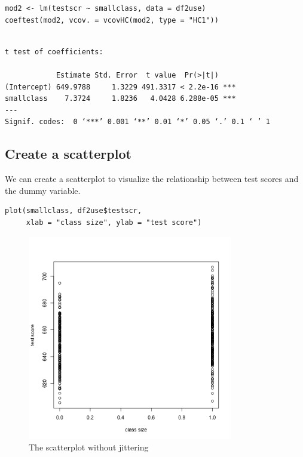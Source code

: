 \documentclass[11pt]{article}
\begin{document}
\begin{verbatim}
mod2 <- lm(testscr ~ smallclass, data = df2use)
coeftest(mod2, vcov. = vcovHC(mod2, type = "HC1"))
\end{verbatim}

\begin{verbatim}

t test of coefficients:

            Estimate Std. Error  t value  Pr(>|t|)
(Intercept) 649.9788     1.3229 491.3317 < 2.2e-16 ***
smallclass    7.3724     1.8236   4.0428 6.288e-05 ***
---
Signif. codes:  0 ‘***’ 0.001 ‘**’ 0.01 ‘*’ 0.05 ‘.’ 0.1 ‘ ’ 1
\end{verbatim}


\subsection*{Create a scatterplot}
\label{sec:orgfcd5ef1}

We can create a scatterplot to visualize the relationship between test
scores and the dummy variable.
\begin{verbatim}
plot(smallclass, df2use$testscr,
     xlab = "class size", ylab = "test score")
\end{verbatim}

\begin{figure}[htbp]
\centering
\includegraphics[width=0.8\textwidth]{scatter_smallclass.png}
\caption{\label{fig:orgd00e814}
The scatterplot without jittering}
\end{figure}
\end{document}

